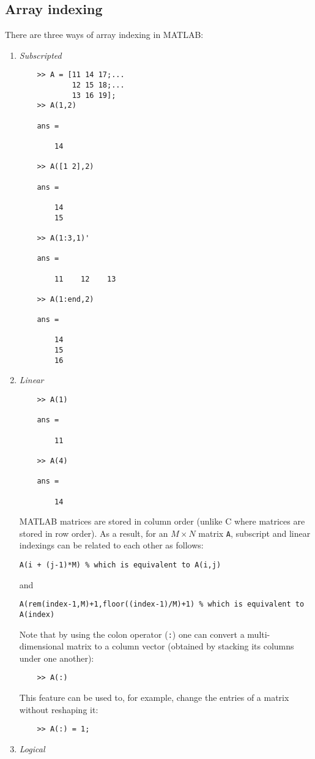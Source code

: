 \documentclass[10pt,a4paper]{article}
\newcounter{example}[section]
\begin{document}
\subsection{Array indexing}
There are three ways of array indexing in MATLAB:
\begin{enumerate}
\item \textit{Subscripted}
\begin{lstlisting}
	>> A = [11 14 17;...
	        12 15 18;...
	        13 16 19];
	>> A(1,2)
	
	ans =
	
	    14
	
	>> A([1 2],2)
	
	ans =
	
	    14
	    15
	
	>> A(1:3,1)'
	
	ans =
	
	    11    12    13
	
	>> A(1:end,2)
	
	ans =
	
	    14
	    15
	    16
\end{lstlisting}
\item \textit{Linear}
\begin{lstlisting}
	>> A(1)
	
	ans =
	
	    11
	
	>> A(4)
	
	ans =
	
	    14
\end{lstlisting}
MATLAB matrices are stored in column order (unlike C where matrices are stored in row order). As a result, for an $M\times N$ matrix \texttt{A}, subscript and linear indexings can be related to each other as follows:
\begin{lstlisting}
A(i + (j-1)*M) % which is equivalent to A(i,j)
\end{lstlisting}
and
\begin{lstlisting}
A(rem(index-1,M)+1,floor((index-1)/M)+1) % which is equivalent to A(index)
\end{lstlisting}
Note that by using the colon operator (\texttt{:}) one can convert a multi-dimensional matrix to a column vector (obtained by stacking its columns under one another):
\begin{lstlisting}
	>> A(:)
\end{lstlisting}
This feature can be used to, for example, change the entries of a matrix without reshaping it:
\begin{lstlisting}
	>> A(:) = 1;
\end{lstlisting}
\item \textit{Logical}


\end{enumerate}
\end{document}
